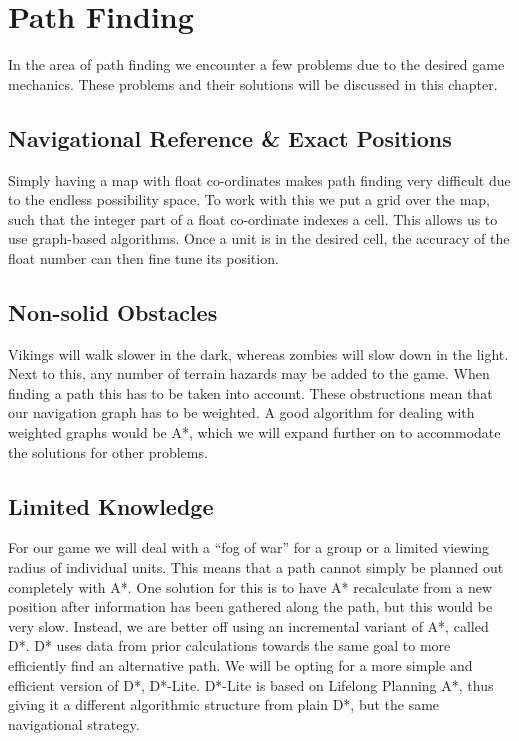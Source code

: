 \section{Path Finding}
In the area of path finding we encounter a few problems due to the desired game mechanics. These problems and their solutions will be discussed in this chapter.

\subsection{Navigational Reference \& Exact Positions}
Simply having a map with float co-ordinates makes path finding very difficult due to the endless possibility space. To work with this we put a grid over the map, such that the integer part of a float co-ordinate indexes a cell. This allows us to use graph-based algorithms. Once a unit is in the desired cell, the accuracy of the float number can then fine tune its position.

\subsection{Non-solid Obstacles}
Vikings will walk slower in the dark, whereas zombies will slow down in the light. Next to this, any number of terrain hazards may be added to the game. When finding a path this has to be taken into account. These obstructions mean that our navigation graph has to be weighted. A good algorithm for dealing with weighted graphs would be A*, which we will expand further on to accommodate the solutions for other problems.

\subsection{Limited Knowledge}
For our game we will deal with a ``fog of war'' for a group or a limited viewing radius of individual units. This means that a path cannot simply be planned out completely with A*. One solution for this is to have A* recalculate from a new position after information has been gathered along the path, but this would be very slow. Instead, we are better off using an incremental variant of A*, called D*. D* uses data from prior calculations towards the same goal to more efficiently find an alternative path. We will be opting for a more simple and efficient version of D*, D*-Lite. D*-Lite is based on Lifelong Planning A*, thus giving it a different algorithmic structure from plain D*, but the same navigational strategy. 

